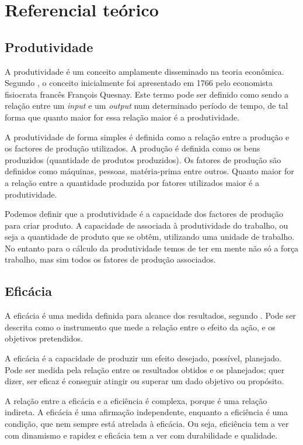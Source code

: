 \chapter[Referencial teórico]{Referencial teórico}

\section{Produtividade}

A produtividade é um conceito amplamente disseminado na teoria econômica. Segundo , o conceito inicialmente foi apresentado em 1766 pelo economista fisiocrata francês François Quesnay.  Este termo pode ser definido como sendo a relação entre um  \textit{input} e um \textit{output} num determinado período de tempo, de tal forma que quanto maior for essa relação maior é a produtividade.

A produtividade de forma simples é definida como a relação entre a produção e os factores de produção utilizados. A produção é definida como os bens produzidos (quantidade de produtos produzidos). Os fatores de produção são definidos como máquinas, pessoas, matéria-prima entre outros. Quanto maior for a relação entre a quantidade produzida por fatores utilizados maior é a produtividade.

Podemos definir que a produtividade é a capacidade dos factores de produção para criar produto. A capacidade de associada à produtividade do trabalho, ou seja a quantidade de produto que se obtêm, utilizando uma unidade de trabalho. No entanto para o cálculo da produtividade temos de ter em mente não só a força trabalho, mas sim todos os fatores de produção associados.


\section{Eficácia}

A eficácia é uma medida definida para alcance dos resultados, segundo . Pode ser descrita como o instrumento que mede a relação entre o efeito da ação, e os objetivos pretendidos.

A eficácia é a capacidade de produzir um efeito desejado, possível, planejado. Pode ser medida pela relação entre os resultados obtidos e os planejados; quer dizer, ser eficaz é conseguir atingir ou superar um dado objetivo ou propósito.

A relação entre a eficácia e a eficiência é complexa, porque é uma relação indireta. A eficácia é uma afirmação independente, enquanto a eficiência é uma condição, que nem sempre está atrelada à eficácia. Ou seja, eficiência tem a ver com dinamismo e rapidez e eficácia tem a ver com durabilidade e qualidade.

